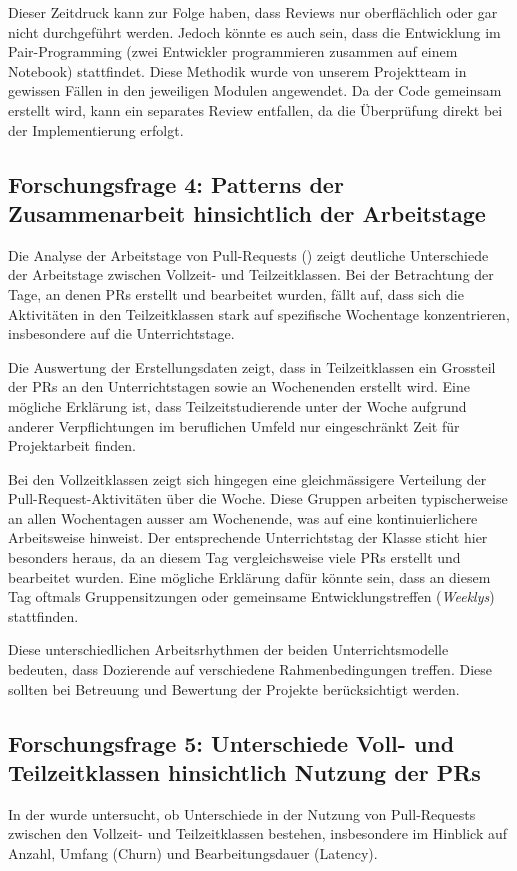 Dieser Zeitdruck kann zur Folge haben, dass Reviews nur oberflächlich oder gar nicht durchgeführt werden. Jedoch könnte es auch sein, dass die Entwicklung im Pair-Programming (zwei Entwickler programmieren zusammen auf einem Notebook) stattfindet. Diese Methodik wurde von unserem Projektteam in gewissen Fällen in den jeweiligen Modulen angewendet. Da der Code gemeinsam erstellt wird, kann ein separates Review entfallen, da die Überprüfung direkt bei der Implementierung erfolgt.


\subsection{Forschungsfrage 4: Patterns der Zusammenarbeit hinsichtlich der Arbeitstage}
Die Analyse der Arbeitstage von Pull-Requests () zeigt deutliche Unterschiede der Arbeitstage zwischen Vollzeit- und Teilzeitklassen. Bei der Betrachtung der Tage, an denen PRs erstellt und bearbeitet wurden, fällt auf, dass sich die Aktivitäten in den Teilzeitklassen stark auf spezifische Wochentage konzentrieren, insbesondere auf die Unterrichtstage. 

Die Auswertung der Erstellungsdaten zeigt, dass in Teilzeitklassen ein Grossteil der PRs an den Unterrichtstagen sowie an Wochenenden erstellt wird. Eine mögliche Erklärung ist, dass Teilzeitstudierende unter der Woche aufgrund anderer Verpflichtungen im beruflichen Umfeld nur eingeschränkt Zeit für Projektarbeit finden.

Bei den Vollzeitklassen zeigt sich hingegen eine gleichmässigere Verteilung der Pull-Request-Aktivitäten über die Woche. Diese Gruppen arbeiten typischerweise an allen Wochentagen ausser am Wochenende, was auf eine kontinuierlichere Arbeitsweise hinweist. Der entsprechende Unterrichtstag der Klasse sticht hier besonders heraus, da an diesem Tag vergleichsweise viele PRs erstellt und bearbeitet wurden. Eine mögliche Erklärung dafür könnte sein, dass an diesem Tag oftmals Gruppensitzungen oder gemeinsame Entwicklungstreffen (\textit{Weeklys}) stattfinden. 

Diese unterschiedlichen Arbeitsrhythmen der beiden Unterrichtsmodelle bedeuten, dass Dozierende auf verschiedene Rahmenbedingungen treffen. Diese sollten bei Betreuung und Bewertung der Projekte berücksichtigt werden.

\subsection{Forschungsfrage 5: Unterschiede Voll- und Teilzeitklassen hinsichtlich Nutzung der PRs}
In der  wurde untersucht, ob Unterschiede in der Nutzung von Pull-Requests zwischen den Vollzeit- und Teilzeitklassen bestehen, insbesondere im Hinblick auf Anzahl, Umfang (Churn) und Bearbeitungsdauer (Latency).

